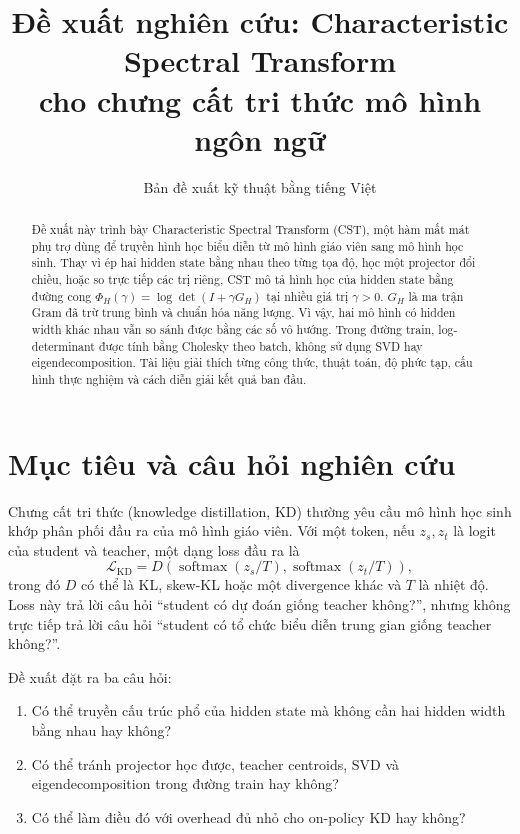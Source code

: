 \documentclass{article}
\title{Đề xuất nghiên cứu: Characteristic Spectral Transform\\
cho chưng cất tri thức mô hình ngôn ngữ}
\author{Bản đề xuất kỹ thuật bằng tiếng Việt}
\newcommand{\cst}{\textsc{CST}}
\begin{document}
\maketitle

\begin{abstract}
Đề xuất này trình bày Characteristic Spectral Transform (\cst), một hàm mất
mát phụ trợ dùng để truyền hình học biểu diễn từ mô hình giáo viên sang mô hình
học sinh.  Thay vì ép hai hidden state bằng nhau theo từng tọa độ, học một
projector đổi chiều, hoặc so trực tiếp các trị riêng, \cst{} mô tả hình học của
hidden state bằng đường cong
$\Phi_H(\gamma)=\log\det(I+\gamma G_H)$ tại nhiều giá trị $\gamma>0$.
$G_H$ là ma trận Gram đã trừ trung bình và chuẩn hóa năng lượng.  Vì vậy, hai
mô hình có hidden width khác nhau vẫn so sánh được bằng các số vô hướng.
Trong đường train, log-determinant được tính bằng Cholesky theo batch, không sử
dụng SVD hay eigendecomposition.  Tài liệu giải thích từng công thức, thuật toán,
độ phức tạp, cấu hình thực nghiệm và cách diễn giải kết quả ban đầu.
\end{abstract}

\section{Mục tiêu và câu hỏi nghiên cứu}

Chưng cất tri thức (knowledge distillation, KD) thường yêu cầu mô hình học sinh
khớp phân phối đầu ra của mô hình giáo viên.  Với một token, nếu $z_s,z_t$ là
logit của student và teacher, một dạng loss đầu ra là
\begin{equation}
 \mathcal L_{\mathrm{KD}}
 =D\!\left(
   \operatorname{softmax}(z_s/T),
   \operatorname{softmax}(z_t/T)
 \right),
 \label{eq:output-kd}
\end{equation}
trong đó $D$ có thể là KL, skew-KL hoặc một divergence khác và $T$ là nhiệt độ.
Loss này trả lời câu hỏi ``student có dự đoán giống teacher không?'', nhưng
không trực tiếp trả lời câu hỏi ``student có tổ chức biểu diễn trung gian giống
teacher không?''.

Đề xuất đặt ra ba câu hỏi:
\begin{enumerate}
 \item Có thể truyền cấu trúc phổ của hidden state mà không cần hai hidden width
 bằng nhau hay không?
 \item Có thể tránh projector học được, teacher centroids, SVD và
 eigendecomposition trong đường train hay không?
 \item Có thể làm điều đó với overhead đủ nhỏ cho on-policy KD hay không?
\end{enumerate}
\end{document}
